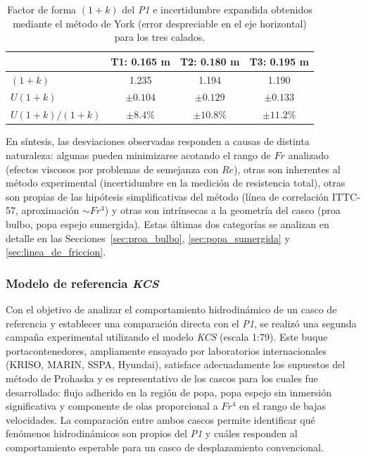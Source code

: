 \begin{table}[H]
\centering
\caption{Factor de forma $(1+k)$ del \textit{P1} e incertidumbre expandida
obtenidos mediante el método de York (error despreciable en el eje
horizontal) para los tres calados.}
\begin{tabular}{lccc}
\hline
 & \textbf{T1: 0.165 m} & \textbf{T2: 0.180 m} & \textbf{T3: 0.195 m} \\
\hline
$(1+k)$   & 1.235 & 1.194 & 1.190 \\
$U(1+k)$  & $\pm 0{.}104$ & $\pm 0{.}129$ & $\pm 0{.}133$ \\
$U(1+k)/(1+k)$ & $\pm 8{.}4\%$ & $\pm 10{.}8\%$ & $\pm 11{.}2\%$ \\
\hline
\end{tabular}
\label{tab:york_tpa}
\end{table}



En síntesis, las desviaciones observadas responden a causas de distinta 
naturaleza: algunas pueden minimizarse acotando el rango de $Fr$ analizado 
(efectos viscosos por problemas de semejanza con $Re$), otras son inherentes 
al método experimental (incertidumbre en la medición de resistencia total), 
otras son propias de las hipótesis simplificativas del método (línea de 
correlación ITTC-57, aproximación ${\sim}Fr^4$) y otras son intrínsecas 
a la geometría del casco (proa bulbo, popa espejo sumergida). Estas últimas 
dos categorías se analizan en detalle en las 
Secciones~\ref{sec:proa_bulbo}, \ref{sec:popa_sumergida} 
y \ref{sec:linea_de_friccion}.

\vspace{1em}
\subsubsection{Modelo de referencia \textit{KCS}}

Con el objetivo de analizar el comportamiento hidrodinámico de un casco 
de referencia y establecer una comparación directa con el \textit{P1}, 
se realizó una segunda campaña experimental utilizando el modelo \textit{KCS} 
(escala 1:79). Este buque portacontenedores, ampliamente ensayado por 
laboratorios internacionales (KRISO, MARIN, SSPA, Hyundai), satisface 
adecuadamente los supuestos del método de Prohaska y es representativo 
de los cascos para los cuales fue desarrollado: flujo adherido en la 
región de popa, popa espejo sin inmersión significativa y componente de 
olas proporcional a $Fr^4$ en el rango de bajas velocidades. La 
comparación entre ambos cascos permite identificar qué fenómenos 
hidrodinámicos son propios del \textit{P1} y cuáles responden al 
comportamiento esperable para un casco de desplazamiento convencional.


